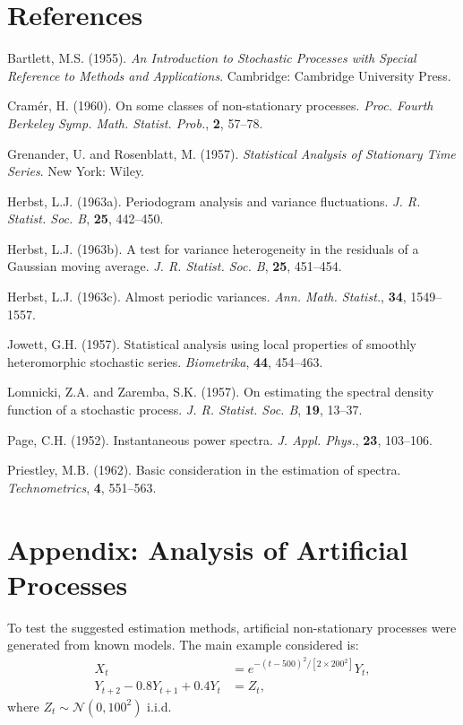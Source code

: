 \documentclass[12pt]{article}
\theoremstyle{definition}
\theoremstyle{plain}
\theoremstyle{remark}
\begin{document}
\section*{References}
\begin{thebibliography}{99}
Bartlett, M.S. (1955). \emph{An Introduction to Stochastic Processes with Special Reference to Methods and Applications}. Cambridge: Cambridge University Press.

Cramér, H. (1960). On some classes of non-stationary processes. \emph{Proc. Fourth Berkeley Symp. Math. Statist. Prob.}, \textbf{2}, 57--78.

Grenander, U. and Rosenblatt, M. (1957). \emph{Statistical Analysis of Stationary Time Series}. New York: Wiley.

Herbst, L.J. (1963a). Periodogram analysis and variance fluctuations. \emph{J. R. Statist. Soc. B}, \textbf{25}, 442--450.

Herbst, L.J. (1963b). A test for variance heterogeneity in the residuals of a Gaussian moving average. \emph{J. R. Statist. Soc. B}, \textbf{25}, 451--454.

Herbst, L.J. (1963c). Almost periodic variances. \emph{Ann. Math. Statist.}, \textbf{34}, 1549--1557.

Jowett, G.H. (1957). Statistical analysis using local properties of smoothly heteromorphic stochastic series. \emph{Biometrika}, \textbf{44}, 454--463.

Lomnicki, Z.A. and Zaremba, S.K. (1957). On estimating the spectral density function of a stochastic process. \emph{J. R. Statist. Soc. B}, \textbf{19}, 13--37.

Page, C.H. (1952). Instantaneous power spectra. \emph{J. Appl. Phys.}, \textbf{23}, 103--106.

Priestley, M.B. (1962). Basic consideration in the estimation of spectra. \emph{Technometrics}, \textbf{4}, 551--563.
\end{thebibliography}

\appendix
\section*{Appendix: Analysis of Artificial Processes}

To test the suggested estimation methods, artificial non-stationary processes were generated from known models. The main example considered is:
\begin{align}
X_t &= e^{-(t-500)^2 / [2 \times 200^2]} Y_t,\\
Y_{t+2} - 0.8 Y_{t+1} + 0.4 Y_t &= Z_t,
\end{align}
where $Z_t \sim \mathcal{N}(0, 100^2)$ i.i.d.
\end{document}
